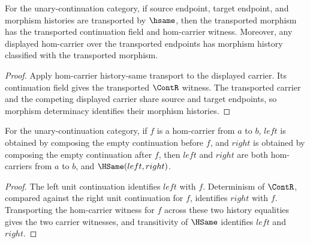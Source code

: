 \begin{theorem}
\label{thm:category-hom-carrier-endpoint-transport-cont-classified}
For the unary-continuation category, if source endpoint, target endpoint, and
morphism histories are transported by $\hsame$, then the transported morphism
has the transported continuation field and hom-carrier witness. Moreover, any
displayed hom-carrier over the transported endpoints has morphism history
classified with the transported morphism.
\end{theorem}
\begin{proof}
Apply hom-carrier history-same transport to the displayed carrier. Its
continuation field gives the transported $\ContR$ witness. The transported
carrier and the competing displayed carrier share source and target endpoints,
so morphism determinacy identifies their morphism histories.
\end{proof}

\begin{theorem}
\label{thm:category-hom-carrier-identity-square-closed}
For the unary-continuation category, if \(f\) is a hom-carrier from \(a\)
to \(b\), \(left\) is obtained by composing the empty continuation before
\(f\), and \(right\) is obtained by composing the empty continuation after
\(f\), then \(left\) and \(right\) are both hom-carriers from \(a\) to \(b\),
and \(\HSame(left,right)\).
\end{theorem}
\begin{proof}
The left unit continuation identifies \(left\) with \(f\). Determinism of
\(\ContR\), compared against the right unit continuation for \(f\), identifies
\(right\) with \(f\). Transporting the hom-carrier witness for \(f\) across
these two history equalities gives the two carrier witnesses, and transitivity
of \(\HSame\) identifies \(left\) and \(right\).
\end{proof}

